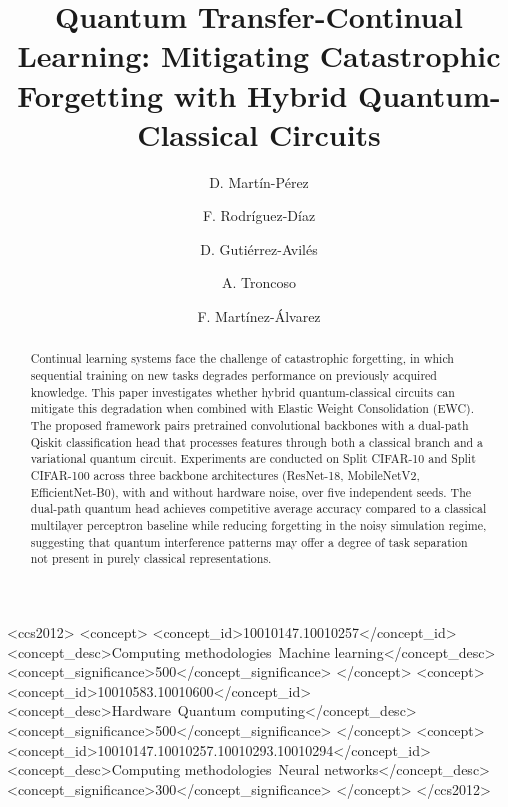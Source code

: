 \documentclass[acmlarge]{acmart}
\begin{document}
\title{Quantum Transfer-Continual Learning: Mitigating Catastrophic Forgetting with Hybrid Quantum-Classical Circuits}

\author{D. Martín-Pérez}

\author{F. Rodríguez-Díaz}

\author{D. Gutiérrez-Avilés}

\author{A. Troncoso}

\author{F. Martínez-Álvarez}

\begin{abstract}
Continual learning systems face the challenge of catastrophic forgetting, in which sequential training on new tasks degrades performance on previously acquired knowledge.
This paper investigates whether hybrid quantum-classical circuits can mitigate this degradation when combined with Elastic Weight Consolidation (EWC).
The proposed framework pairs pretrained convolutional backbones with a dual-path Qiskit classification head that processes features through both a classical branch and a variational quantum circuit.
Experiments are conducted on Split CIFAR-10 and Split CIFAR-100 across three backbone architectures (ResNet-18, MobileNetV2, EfficientNet-B0), with and without hardware noise, over five independent seeds.
The dual-path quantum head achieves competitive average accuracy compared to a classical multilayer perceptron baseline while reducing forgetting in the noisy simulation regime, suggesting that quantum interference patterns may offer a degree of task separation not present in purely classical representations.
\end{abstract}


\begin{CCSXML}
<ccs2012>
   <concept>
       <concept_id>10010147.10010257</concept_id>
       <concept_desc>Computing methodologies~Machine learning</concept_desc>
       <concept_significance>500</concept_significance>
   </concept>
   <concept>
       <concept_id>10010583.10010600</concept_id>
       <concept_desc>Hardware~Quantum computing</concept_desc>
       <concept_significance>500</concept_significance>
   </concept>
   <concept>
       <concept_id>10010147.10010257.10010293.10010294</concept_id>
       <concept_desc>Computing methodologies~Neural networks</concept_desc>
       <concept_significance>300</concept_significance>
   </concept>
</ccs2012>
\end{CCSXML}
\end{document}
